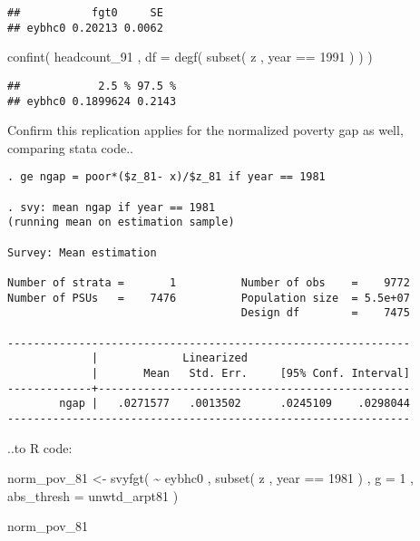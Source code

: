 \documentclass[
]{book}
\newenvironment{Shaded}{\begin{snugshade}}{\end{snugshade}}
\newcommand{\AttributeTok}[1]{\textcolor[rgb]{0.77,0.63,0.00}{#1}}
\newcommand{\DecValTok}[1]{\textcolor[rgb]{0.00,0.00,0.81}{#1}}
\newcommand{\FunctionTok}[1]{\textcolor[rgb]{0.00,0.00,0.00}{#1}}
\newcommand{\NormalTok}[1]{#1}
\newcommand{\OtherTok}[1]{\textcolor[rgb]{0.56,0.35,0.01}{#1}}
\newcommand{\SpecialCharTok}[1]{\textcolor[rgb]{0.00,0.00,0.00}{#1}}
\begin{document}
\begin{verbatim}
##           fgt0     SE
## eybhc0 0.20213 0.0062
\end{verbatim}

\begin{Shaded}
\begin{Highlighting}[]
\FunctionTok{confint}\NormalTok{( headcount\_91 , }\AttributeTok{df =} \FunctionTok{degf}\NormalTok{( }\FunctionTok{subset}\NormalTok{( z , year }\SpecialCharTok{==} \DecValTok{1991}\NormalTok{ ) ) )}
\end{Highlighting}
\end{Shaded}

\begin{verbatim}
##            2.5 % 97.5 %
## eybhc0 0.1899624 0.2143
\end{verbatim}

Confirm this replication applies for the normalized poverty gap as well, comparing stata code..

\begin{verbatim}
. ge ngap = poor*($z_81- x)/$z_81 if year == 1981

. svy: mean ngap if year == 1981
(running mean on estimation sample)

Survey: Mean estimation

Number of strata =       1          Number of obs    =    9772
Number of PSUs   =    7476          Population size  = 5.5e+07
                                    Design df        =    7475

--------------------------------------------------------------
             |             Linearized
             |       Mean   Std. Err.     [95% Conf. Interval]
-------------+------------------------------------------------
        ngap |   .0271577   .0013502      .0245109    .0298044
--------------------------------------------------------------
\end{verbatim}

..to R code:

\begin{Shaded}
\begin{Highlighting}[]
\NormalTok{norm\_pov\_81 }\OtherTok{\textless{}{-}} 
    \FunctionTok{svyfgt}\NormalTok{( }
        \SpecialCharTok{\textasciitilde{}}\NormalTok{ eybhc0 , }
        \FunctionTok{subset}\NormalTok{( z , year }\SpecialCharTok{==} \DecValTok{1981}\NormalTok{ ) , }
        \AttributeTok{g =} \DecValTok{1}\NormalTok{ , }
        \AttributeTok{abs\_thresh =}\NormalTok{ unwtd\_arpt81}
\NormalTok{    )}
    
\NormalTok{norm\_pov\_81}
\end{Highlighting}
\end{Shaded}
\end{document}
